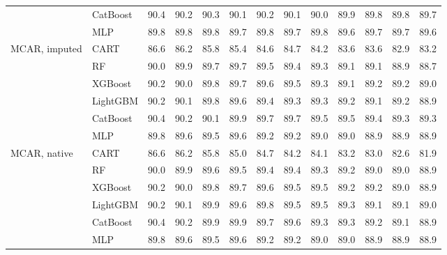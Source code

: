 \documentclass[pdflatex,sn-mathphys]{sn-jnl}
\theoremstyle{thmstyleone}
\begin{document}
\begin{table}[htbp]
\begin{tabular}{@{}llrrrrrrrrrrr@{}}
 & CatBoost & 90.4 & 90.2 & 90.3 & 90.1 & 90.2 & 90.1 & 90.0 & 89.9 & 89.8 & 89.8 & 89.7 \\
 & MLP & 89.8 & 89.8 & 89.8 & 89.7 & 89.8 & 89.7 & 89.8 & 89.6 & 89.7 & 89.7 & 89.6 \\
\midrule
MCAR, imputed & CART & 86.6 & 86.2 & 85.8 & 85.4 & 84.6 & 84.7 & 84.2 & 83.6 & 83.6 & 82.9 & 83.2 \\
 & RF & 90.0 & 89.9 & 89.7 & 89.7 & 89.5 & 89.4 & 89.3 & 89.1 & 89.1 & 88.9 & 88.7 \\
 & XGBoost & 90.2 & 90.0 & 89.8 & 89.7 & 89.6 & 89.5 & 89.3 & 89.1 & 89.2 & 89.2 & 89.0 \\
 & LightGBM & 90.2 & 90.1 & 89.8 & 89.6 & 89.4 & 89.3 & 89.3 & 89.2 & 89.1 & 89.2 & 88.9 \\
 & CatBoost & 90.4 & 90.2 & 90.1 & 89.9 & 89.7 & 89.7 & 89.5 & 89.5 & 89.4 & 89.3 & 89.3 \\
 & MLP & 89.8 & 89.6 & 89.5 & 89.6 & 89.2 & 89.2 & 89.0 & 89.0 & 88.9 & 88.9 & 88.9 \\
\midrule
MCAR, native & CART & 86.6 & 86.2 & 85.8 & 85.0 & 84.7 & 84.2 & 84.1 & 83.2 & 83.0 & 82.6 & 81.9 \\
 & RF & 90.0 & 89.9 & 89.6 & 89.5 & 89.4 & 89.4 & 89.3 & 89.2 & 89.0 & 89.0 & 88.9 \\
 & XGBoost & 90.2 & 90.0 & 89.8 & 89.7 & 89.6 & 89.5 & 89.5 & 89.2 & 89.2 & 89.0 & 88.9 \\
 & LightGBM & 90.2 & 90.1 & 89.9 & 89.6 & 89.8 & 89.5 & 89.5 & 89.3 & 89.1 & 89.1 & 89.0 \\
 & CatBoost & 90.4 & 90.2 & 89.9 & 89.9 & 89.7 & 89.6 & 89.3 & 89.3 & 89.2 & 89.1 & 88.9 \\
 & MLP & 89.8 & 89.6 & 89.5 & 89.6 & 89.2 & 89.2 & 89.0 & 89.0 & 88.9 & 88.9 & 88.9 \\
\bottomrule
\end{tabular}
\end{table}
\end{document}
